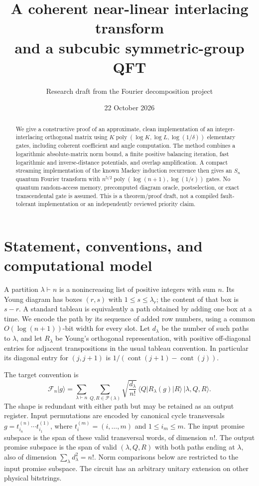\documentclass[11pt]{article}
\title{A coherent near-linear interlacing transform\\and a subcubic symmetric-group QFT}
\author{Research draft from the Fourier decomposition project}
\date{22 October 2026}
\theoremstyle{definition}
\newcommand{\ket}[1]{\lvert #1\rangle}
\newcommand{\bra}[1]{\langle #1\rvert}
\newcommand{\poly}{\operatorname{poly}}
\newcommand{\F}{\mathcal F}
\begin{document}
\maketitle

\begin{abstract}
We give a constructive proof of an approximate, clean implementation of an
integer-interlacing orthogonal matrix using
$K\poly(\log K,\log L,\log(1/\delta))$ elementary gates, including coherent
coefficient and angle computation. The method combines a logarithmic
absolute-matrix norm bound, a finite positive balancing iteration, fast
logarithmic and inverse-distance potentials, and overlap amplification.
A compact streaming implementation of the known Mackey induction recurrence
then gives an $S_n$ quantum Fourier transform with
$n^{5/2}\poly(\log(n+1),\log(1/\epsilon))$ gates. No quantum random-access
memory, precomputed diagram oracle, postselection, or exact transcendental
gate is assumed. This is a theorem/proof draft, not a compiled
fault-tolerant implementation or an independently reviewed priority claim.
\end{abstract}

\section{Statement, conventions, and computational model}

A partition $\lambda\vdash n$ is a nonincreasing list of positive integers
with sum $n$. Its Young diagram has boxes $(r,s)$ with $1\le s\le\lambda_r$;
the content of that box is $s-r$. A standard tableau is equivalently a
path obtained by adding one box at a time. We encode the path by its sequence
of added row numbers, using a common $O(\log(n+1))$-bit width for every slot.
Let $d_\lambda$ be the number of such paths to $\lambda$, and let
$R_\lambda$ be Young's orthogonal representation, with positive
off-diagonal entries for adjacent transpositions in the usual tableau
convention. In particular its diagonal entry for $(j,j+1)$ is
$1/(\operatorname{cont}(j+1)-\operatorname{cont}(j))$.

The target convention is
\begin{equation}\label{eq:qft}
 \F_n\ket{g}=
 \sum_{\lambda\vdash n}\sum_{Q,R\in\mathcal P(\lambda)}
 \sqrt{\frac{d_\lambda}{n!}}\,
 \bra Q R_\lambda(g)\ket R\,\ket{\lambda,Q,R}.
\end{equation}
The shape is redundant with either path but may be retained as an output
register. Input permutations are encoded by canonical cycle transversals
$g=t_{i_n}^{(n)}\cdots t_{i_1}^{(1)}$, where
$t_i^{(m)}=(i,\ldots,m)$ and $1\le i_m\le m$.
The input promise subspace is the span of these valid transversal words,
of dimension $n!$. The output promise subspace is the span of valid
$(\lambda,Q,R)$ with both paths ending at $\lambda$, also of dimension
$\sum_\lambda d_\lambda^2=n!$. Norm comparisons below are restricted to
the input promise subspace. The circuit has an arbitrary unitary extension
on other physical bitstrings.
\end{document}
